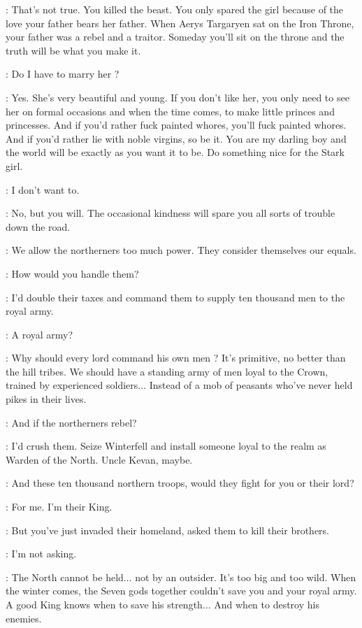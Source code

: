 \CERSEI: That's not true. You killed the beast. You only spared the girl because of the love your father bears her father. When Aerys Targaryen sat on the Iron Throne, your father was a rebel and a traitor. Someday you'll sit on the throne and the truth will be what you make it. 

\JOFFREY: Do I have to marry her ? 

\CERSEI: Yes. She's very beautiful and young. If you don't like her, you only need to see her on formal occasions and when the time comes, to make little princes and princesses. And if you'd rather fuck painted whores, you'll fuck painted whores. And if you'd rather lie with noble virgins, so be it. You are my darling boy and the world will be exactly as you want it to be. Do something nice for the Stark girl. 

\JOFFREY: I don't want to. 

\CERSEI: No, but you will. The occasional kindness will spare you all sorts of trouble down the road. 

\JOFFREY: We allow the northerners too much power. They consider themselves our equals. 

\CERSEI: How would you handle them? 

\JOFFREY: I'd double their taxes and command them to supply ten thousand men to the royal army. 

\CERSEI: A royal army? 

\JOFFREY: Why should every lord command his own men ? It's primitive, no better than the hill tribes. We should have a standing army of men loyal to the Crown, trained by experienced soldiers$\ldots$ Instead of a mob of peasants who've never held pikes in their lives. 

\CERSEI: And if the northerners rebel? 

\JOFFREY: I'd crush them. Seize Winterfell and install someone loyal to the realm as Warden of the North. Uncle Kevan, maybe. 

\CERSEI: And these ten thousand northern troops, would they fight for you or their lord? 

\JOFFREY: For me. I'm their King. 

\CERSEI: But you've just invaded their homeland, asked them to kill their brothers. 

\JOFFREY: I'm not asking. 

\CERSEI: The North cannot be held$\ldots$ not by an outsider. It's too big and too wild. When the winter comes, the Seven gods together couldn't save you and your royal army. A good King knows when to save his strength$\ldots$ And when to destroy his enemies. 

